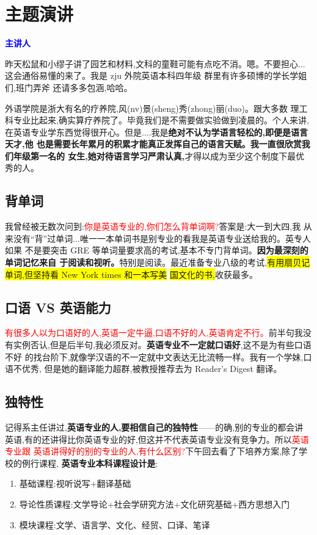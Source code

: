 \documentclass[utf8,a4paper]{ctexart}
\theoremstyle{nonumberplain}
\theoremstyle{nonumberplain}
\newcommand\tips[1]{\colorbox{yellow}{#1}}
\newcommand\lecturer[1][主讲人]{\textcolor{blue}{\bf#1}}
\begin{document}
\section{主题演讲}
\lecturer

昨天松鼠和小缪子讲了园艺和材料,文科的童鞋可能有点吃不消。嗯。不要担心...这会通俗易懂的来了。我是 zju 外院英语本科四年级 群里有许多硕博的学长学姐们,班门弄斧 还请多多包涵,哈哈。

外语学院是浙大有名的疗养院,风(nv)景(sheng)秀(zhong)丽(duo)。跟大多数 理工科专业比起来,确实算疗养院了。毕竟我们是不需要做实验做到凌晨的。个人来讲,在英语专业学东西觉得很开心。但是....我是\textbf{绝对不认为学语言轻松的,即便是语言天才,他 也是需要长年累月的积累才能真正发挥自己的语言天赋。我一直很欣赏我们年级第一名的 女生,她对待语言学习严肃认真,}才得以成为至少这个制度下最优秀的人。

\subsection{背单词}
我曾经被无数次问到:\textcolor{red}{你是英语专业的,你们怎么背单词啊?}答案是:大一到大四,我 从来没有“背”过单词...唯一一本单词书是别专业的看我是英语专业送给我的。英专人如果 不是要突击 GRE 等单词量要求高的考试,基本不专门背单词。\textbf{因为最深刻的单词记忆来自 于阅读和视听。}特别是阅读。最近准备专业八级的考试,\tips{有用扇贝记单词,但坚持看 New York times 和一本写美}
\tips{国文化的书,}收获最多。

\subsection{口语 VS 英语能力}
\textcolor{red}{有很多人以为口语好的人,英语一定牛逼,口语不好的人,英语肯定不行。}前半句我没
有实例否认,但是后半句,我必须反对。\textbf{英语专业不一定就口语好},这不是为有些口语不好 的找台阶下,就像学汉语的不一定就中文表达无比流畅一样。我有一个学妹,口语不优秀, 但是她的翻译能力超群,被教授推荐去为 Reader’s Digest 翻译。
\subsection{独特性}
记得系主任讲过,\textbf{英语专业的人,要相信自己的独特性}——的确,别的专业的都会讲 英语,有的还讲得比你英语专业的好,但这并不代表英语专业没有竞争力。所以\textcolor{red}{英语专业跟 英语讲得好的别的专业的人,有什么区别?}下午回去看了下培养方案,除了学校的例行课程, \textbf{英语专业本科课程设计是}:

\begin{enumerate}
    \bfseries
  \item 
基础课程:视听说写+翻译基础
\item
导论性质课程:文学导论+社会学研究方法+文化研究基础+西方思想入门
\item
模块课程:文学、语言学、文化、经贸、口译、笔译
\end{enumerate}
\end{document}
